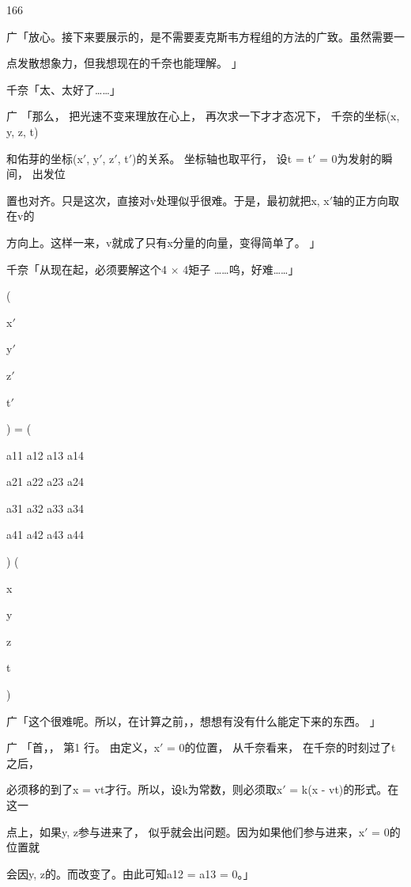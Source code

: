 166\par
广「放心。接下来要展示的，是不需要麦克斯韦方程组的方法的广致。虽然需要一\par
点发散想象力，但我想现在的千奈也能理解。 」\par
千奈「太、太好了……」\par
广 「那么， 把光速不变来理放在心上， 再次求一下才才态况下， 千奈的坐标(x, y, z, t)\par
和佑芽的坐标(x$\prime$, y$\prime$, z$\prime$, t$\prime$)的关系。 坐标轴也取平行， 设t = t$\prime$ = 0为发射的瞬间， 出发位\par
置也对齐。只是这次，直接对v处理似乎很难。于是，最初就把x, x$\prime$轴的正方向取在v的\par
方向上。这样一来，v就成了只有x分量的向量，变得简单了。 」\par
千奈「从现在起，必须要解这个4 $\times$ 4矩子 ……呜，好难……」\par
(\par
x$\prime$\par
y$\prime$\par
z$\prime$\par
t$\prime$\par
) = (\par
a11 a12 a13 a14\par
a21 a22 a23 a24\par
a31 a32 a33 a34\par
a41 a42 a43 a44\par
) (\par
x\par
y\par
z\par
t\par
)\par
广「这个很难呢。所以，在计算之前，，想想有没有什么能定下来的东西。 」\par
广 「首，， 第1 行。 由定义，x$\prime$ = 0的位置， 从千奈看来， 在千奈的时刻过了t之后，\par
必须移的到了x = vt才行。所以，设k为常数，则必须取x$\prime$ = k(x - vt)的形式。在这一\par
点上，如果y, z参与进来了， 似乎就会出问题。因为如果他们参与进来，x$\prime$ = 0的位置就\par
会因y, z的。而改变了。由此可知a12 = a13 = 0。」\par

